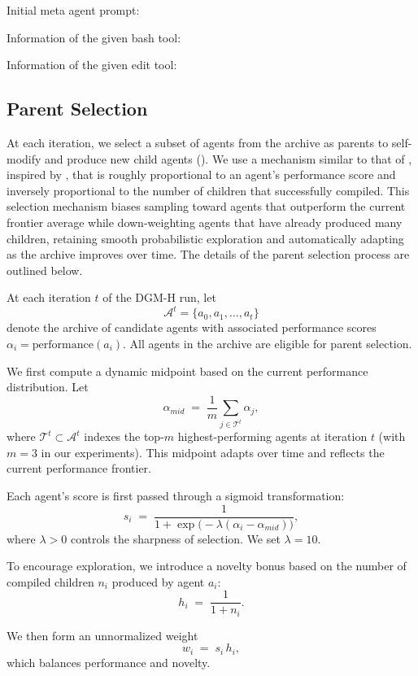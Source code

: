 \documentclass[]{fairmeta}
\begin{document}
Initial meta agent prompt:


Information of the given bash tool:


Information of the given edit tool:


\subsection{Parent Selection}
\label{app:parent-selection}

At each iteration, we select a subset of agents from the archive as parents to self-modify and produce new child agents (). We use a mechanism similar to that of \citet{zhang2025darwin}, inspired by \citet{ecoffet2019go}, that is roughly proportional to an agent's performance score and inversely proportional to the number of children that successfully compiled. This selection mechanism biases sampling toward agents that outperform the current frontier average while down-weighting agents that have already produced many children, retaining smooth probabilistic exploration and automatically adapting as the archive improves over time. The details of the parent selection process are outlined below.

At each iteration \(t\) of the DGM-H run, let
\[
\mathcal{A}^t = \{a_0, a_1, \dots, a_t\}
\]
denote the archive of candidate agents with associated performance scores
\(\alpha_i = \mathrm{performance}(a_i)\).
All agents in the archive are eligible for parent selection.

We first compute a dynamic midpoint based on the current performance distribution. Let
\[
\alpha_{mid} \;=\; \frac{1}{m}\sum_{j \in \mathcal{T}^t} \alpha_j,
\]
where \(\mathcal{T}^t \subset \mathcal{A}^t\) indexes the top-\(m\) highest-performing agents at iteration \(t\) (with \(m=3\) in our experiments).
This midpoint adapts over time and reflects the current performance frontier.

Each agent's score is first passed through a sigmoid transformation:
\[
s_i \;=\; \frac{1}{1 + \exp\!\bigl(-\lambda(\alpha_i - \alpha_{mid})\bigr)},
\]
where \(\lambda > 0\) controls the sharpness of selection. We set \(\lambda = 10\).

To encourage exploration, we introduce a novelty bonus based on the number of compiled children \(n_i\) produced by agent \(a_i\):
\[
h_i \;=\; \frac{1}{1 + n_i}.
\]

We then form an unnormalized weight
\[
w_i \;=\; s_i \, h_i,
\]
which balances performance and novelty.
\end{document}
